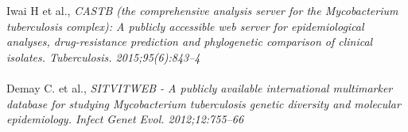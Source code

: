 \documentclass[twoside,a4paper,11pt,frenchb,openany]{report}
\begin{document}
\begin{thebibliography}{10}
Iwai H et al., \textit{CASTB (the comprehensive analysis server for the Mycobacterium tuberculosis complex): A publicly accessible web server for epidemiological analyses, drug-resistance prediction and phylogenetic comparison of clinical isolates. Tuberculosis. 2015;95(6):843–4}\\ \\

Demay C. et al., \textit{SITVITWEB - A publicly available international multimarker database for studying Mycobacterium tuberculosis genetic diversity and molecular epidemiology. Infect Genet Evol. 2012;12:755–66}



\end{thebibliography}
\end{document}
